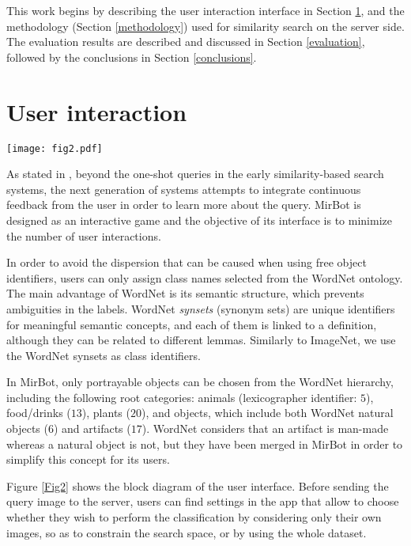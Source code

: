 \documentclass[final, twocolumn]{elsarticle}
\begin{document}
This work begins by describing the user interaction interface in Section \ref{interaction}, and the methodology (Section \ref{methodology}) used for similarity search on the server side. The evaluation results are described and discussed in Section \ref{evaluation}, followed by the conclusions in Section \ref{conclusions}.



\section{User interaction}
\label{interaction}

\begin{figure*}
\center
\texttt{[image: fig2.pdf]}
\caption{\label{Fig2} Diagram of the MirBot interface. The path from \texttt{Server} (after ROI selection) to \texttt{Server} corresponds to the user validation process. }
\end{figure*}

As stated in \cite{Lew2006Content-basedChallenges}, beyond the one-shot queries in the early similarity-based search systems, the next generation of systems attempts to integrate continuous feedback from the user in order to learn more about the query. MirBot is designed as an interactive game and the objective of its interface is to minimize the number of user interactions.

In order to avoid the dispersion that can be caused when using free object identifiers, users can only assign class names selected from the WordNet ontology. The main advantage of WordNet is its semantic structure, which prevents ambiguities in the labels. WordNet \textit{synsets} (synonym sets) are unique identifiers for meaningful semantic concepts, and each of them is linked to a definition, although they can be related to different lemmas. Similarly to ImageNet, we use the WordNet synsets as class identifiers.

In MirBot, only portrayable objects can be chosen from the WordNet hierarchy, including the following root categories: animals (lexicographer identifier: $5$), food/drinks ($13$), plants ($20$), and objects, which include both WordNet natural objects ($6$) and artifacts ($17$). WordNet considers that an artifact is man-made whereas a natural object is not, but they have been merged in MirBot in order to simplify this concept for its users.

Figure \ref{Fig2} shows the block diagram of the user interface. Before sending the query image to the server, users can find settings in the app that allow to choose whether they wish to perform the classification by considering only their own images, so as to constrain the search space, or by using the whole dataset.
\end{document}
